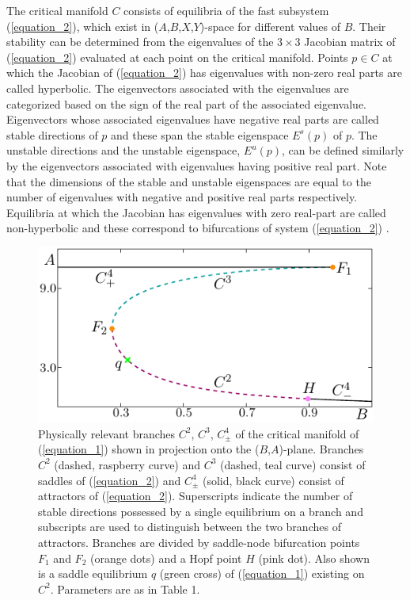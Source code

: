 \documentclass{ws-ijbc}
\begin{document}
The critical manifold $C$ consists of equilibria of the fast subsystem (\ref{equation_2}), which exist in ($A$,$B$,$X$,$Y$)-space for different values of $B$.  Their stability can be determined from the eigenvalues of the $3\times3$ Jacobian matrix of (\ref{equation_2}) evaluated at each point on the critical manifold.  Points $p \in C$ at which the Jacobian of (\ref{equation_2}) has eigenvalues with non-zero real parts are called hyperbolic.  The eigenvectors associated with the eigenvalues are categorized based on the sign of the real part of the associated eigenvalue.  Eigenvectors whose associated eigenvalues have negative real parts are called stable directions of $p$ and these span the stable eigenspace $E^{s}(p)$ of $p$.  The unstable directions and the unstable eigenspace, $E^{u}(p)$, can be defined similarly by the eigenvectors associated with eigenvalues having positive real part.  Note that the dimensions of the stable and unstable eigenspaces are equal to the number of eigenvalues with negative and positive real parts respectively.  Equilibria at which the Jacobian has eigenvalues with zero real-part are called non-hyperbolic and these correspond to bifurcations of system (\ref{equation_2}) \cite{The_Kuz} .

\begin{figure}[!t]
\centering
\includegraphics[]{./figures/MKMO_1.pdf}
\caption{Physically relevant branches $C^2$, $C^3$, $C^4_\pm$ of the critical manifold of (\ref{equation_1}) shown in projection onto the ($B$,$A$)-plane.  Branches $C^2$ (dashed, raspberry curve) and $C^3$ (dashed, teal curve) consist of saddles of (\ref{equation_2}) and $C^4_\pm$ (solid, black curve) consist of attractors of (\ref{equation_2}).  Superscripts indicate the number of stable directions possessed by a single equilibrium on a branch and subscripts are used to distinguish between the two branches of attractors.  Branches are divided by saddle-node bifurcation points $F_1$ and $F_2$ (orange dots) and a Hopf point $H$ (pink dot).  Also shown is a saddle equilibrium $q$ (green cross) of (\ref{equation_1}) existing on $C^2$.  Parameters are as in Table 1.}
\label{figure_1}
\end{figure}
\end{document}
